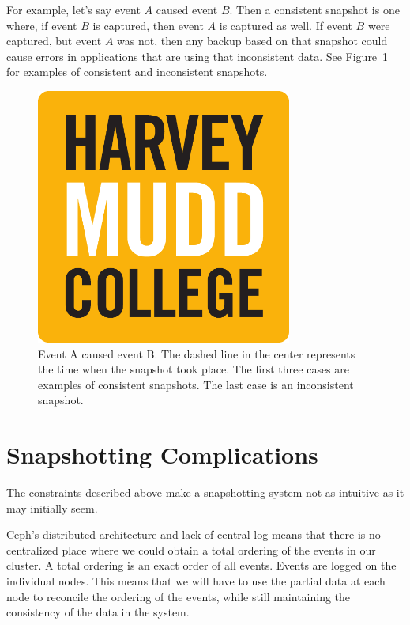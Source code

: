 For example, let's say event $A$ caused event $B$. Then a consistent snapshot 
is one where, if event $B$ is captured, then event $A$ is captured as well. If
event $B$ were captured, but event $A$ was not, then any backup based on that
snapshot could cause errors in applications that are using that inconsistent
data. See Figure~\ref{fig:consistency} for examples of consistent and 
inconsistent snapshots.

\begin{figure}[h]
  \centering
  \caption{Event A caused event B. The dashed line in the center represents the time when the snapshot took place. The first three cases are examples of consistent snapshots. The last case is an inconsistent snapshot.} 
  \label{fig:consistency}
  \includegraphics[width=0.75\textwidth]{hmclogo.pdf}%
\end{figure}

\section{Snapshotting Complications}

The constraints described above make a snapshotting system not as intuitive as
it may initially seem.

Ceph's distributed architecture and lack of central log means that there is no
centralized place where we could obtain a total ordering of the events in our
cluster. A total ordering is an exact order of all events. Events
are logged on the individual nodes. This means that we will have to
use the partial data at each node to reconcile the ordering of the events, 
while still maintaining the consistency of the data in the system.

